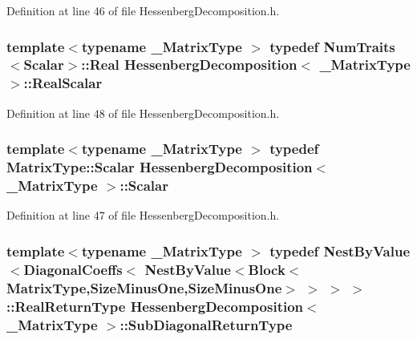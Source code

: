 Definition at line 46 of file Hessenberg\-Decomposition.\-h.

\hypertarget{class_hessenberg_decomposition_a95dd7eea0ca8267932892259b23ac7a9}{
\subsubsection[{Real\-Scalar}]{\setlength{\rightskip}{0pt plus 5cm}template$<$typename \-\_\-\-Matrix\-Type $>$ typedef {\bf Num\-Traits}$<${\bf Scalar}$>$\-::Real {\bf Hessenberg\-Decomposition}$<$ \-\_\-\-Matrix\-Type $>$\-::{\bf Real\-Scalar}}}\label{class_hessenberg_decomposition_a95dd7eea0ca8267932892259b23ac7a9}


Definition at line 48 of file Hessenberg\-Decomposition.\-h.

\hypertarget{class_hessenberg_decomposition_a9120e4a5dcb0f620b221f4f7e5704153}{
\subsubsection[{Scalar}]{\setlength{\rightskip}{0pt plus 5cm}template$<$typename \-\_\-\-Matrix\-Type $>$ typedef Matrix\-Type\-::\-Scalar {\bf Hessenberg\-Decomposition}$<$ \-\_\-\-Matrix\-Type $>$\-::{\bf Scalar}}}\label{class_hessenberg_decomposition_a9120e4a5dcb0f620b221f4f7e5704153}


Definition at line 47 of file Hessenberg\-Decomposition.\-h.

\hypertarget{class_hessenberg_decomposition_a749ce594d9130ea0d804627d86672749}{
\subsubsection[{Sub\-Diagonal\-Return\-Type}]{\setlength{\rightskip}{0pt plus 5cm}template$<$typename \-\_\-\-Matrix\-Type $>$ typedef {\bf Nest\-By\-Value}$<${\bf Diagonal\-Coeffs}$<$ {\bf Nest\-By\-Value}$<${\bf Block}$<${\bf Matrix\-Type},{\bf Size\-Minus\-One},{\bf Size\-Minus\-One}$>$ $>$ $>$ $>$\-::Real\-Return\-Type {\bf Hessenberg\-Decomposition}$<$ \-\_\-\-Matrix\-Type $>$\-::{\bf Sub\-Diagonal\-Return\-Type}}}\label{class_hessenberg_decomposition_a749ce594d9130ea0d804627d86672749}



